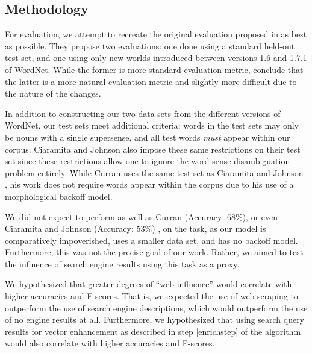 \documentclass{article}
\begin{document}
\subsection{Methodology}


For evaluation, we attempt to recreate the original evaluation proposed in \cite{cj} as best as possible. 
They propose two evaluations: one done using a standard held-out test set, and one using only new worlds introduced between versions 1.6 and 1.7.1 of WordNet. 
While the former is more standard evaluation metric, \cite{cj} conclude that the latter is a more natural evaluation metric and slightly more difficult due to the nature of the changes.

In addition to constructing our two data sets from the different versions of WordNet, our test sets meet additional criteria: words in the test sets may only be nouns with a single supersense, and all test words \emph{must} appear within our corpus. 
Ciaramita and Johnson also impose these same restrictions on their test set \cite{cj} since these restrictions allow one to ignore the word sense disambiguation problem entirely.
While Curran uses the same test set as Ciaramita and Johnson \cite{curran}, his work does not require words appear within the corpus due to his use of a morphological backoff model.

We did not expect to perform as well as Curran (Accuracy: 68\%), or even Ciaramita and Johnson (Accuracy: 53\%) \cite{curran}, on the task, as our model is comparatively impoverished, uses a smaller data set, and has no backoff model. 
Furthermore, this was not the precise goal of our work. 
Rather, we aimed to test the influence of search engine results using this task as a proxy.

We hypothesized that greater degrees of ``web influence'' would correlate with higher accuracies and F-scores. 
That is, we expected the use of web scraping to outperform the use of search engine descriptions, which would outperform the use of no engine results at all.
Furthermore, we hypothesized that using search query results for vector enhancement as described in step \ref{enrichstep} of the algorithm would also correlate with higher accuracies and F-scores.
\end{document}
